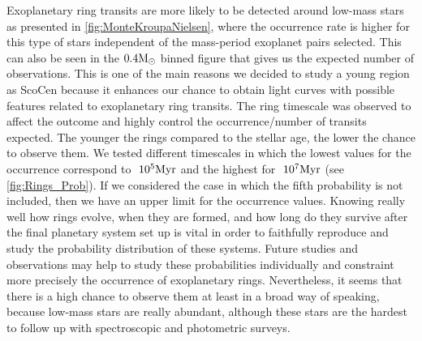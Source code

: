 Exoplanetary ring transits are more likely to be detected around low-mass stars as presented in \autoref{fig:MonteKroupaNielsen}, where the occurrence rate is higher for this type of stars independent of the mass-period exoplanet pairs selected. This can also be seen in the $0.4\textnormal{M}_\odot$ binned figure that gives us the expected number of observations. This is one of the main reasons we decided to study a young region as ScoCen because it enhances our chance to obtain light curves with possible features related to exoplanetary ring transits. The ring timescale was observed to affect the outcome and highly control the occurrence/number of transits expected. The younger the rings compared to the stellar age, the lower the chance to observe them. We tested different timescales in which the lowest values for the occurrence correspond to $~10^5\textnormal{Myr}$ and the highest for $~10^7\textnormal{Myr}$ (see \autoref{fig:Rings_Prob}). If we considered the case in which the fifth probability is not included, then we have an upper limit for the occurrence values. Knowing really well how rings evolve, when they are formed, and how long do they survive after the final planetary system set up is vital in order to faithfully reproduce and study the probability distribution of these systems. Future studies and observations may help to study these probabilities individually and constraint more precisely the occurrence of exoplanetary rings. Nevertheless, it seems that there is a high chance to observe them at least in a broad way of speaking, because low-mass stars are really abundant, although these stars are the hardest to follow up with spectroscopic and photometric surveys.\\

